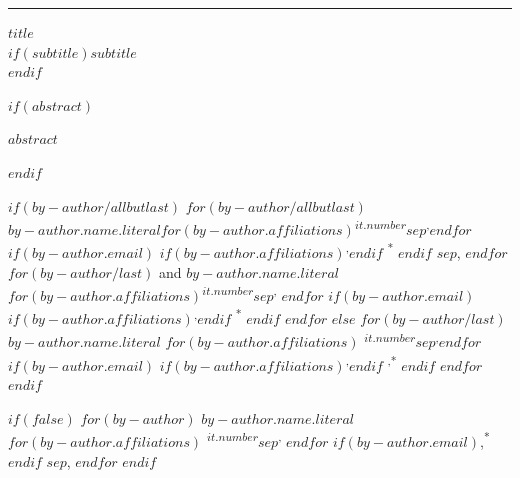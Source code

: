 
\raggedleft %
\thispagestyle{empty}
\rule{1pt}{\textheight} %
\hspace{0.05\textwidth} %
\begin{minipage}[b][\textheight][s]{0.85\textwidth}

\raggedright
{\color{bluegray}\huge\bfseries\nohyphens{$title$}}\\[1.25\baselineskip] 
$if(subtitle)${\color{bluegray}\large\textit{$subtitle$}}\\[4\baselineskip]$endif$

$if(abstract)$%
\begin{flushright}%
{{$abstract$}}\\[4\baselineskip]%
\end{flushright}%
$endif$

$if(by-author/allbutlast)$
$for(by-author/allbutlast)$
 {\large{$by-author.name.literal$}}$for(by-author.affiliations)${\textsuperscript{$it.number$}}$sep$\textsuperscript{,}$endfor$%
$if(by-author.email)$%
$if(by-author.affiliations)$\textsuperscript{,}$endif$%
{\textsuperscript{*}}%
$endif$%
$sep$, 
$endfor$
$for(by-author/last)$%
{ and \large{$by-author.name.literal$}}%
$for(by-author.affiliations)${\textsuperscript{$it.number$}}$sep$\textsuperscript{,}%
$endfor$%
$if(by-author.email)$%
$if(by-author.affiliations)$\textsuperscript{,}$endif$%
{\textsuperscript{*}}%
$endif$%
$endfor$
$else$
$for(by-author/last)$%
{\large{$by-author.name.literal$}}%
$for(by-author.affiliations)$%
{\textsuperscript{$it.number$}}$sep$\textsuperscript{,}$endfor$%
$if(by-author.email)$%
$if(by-author.affiliations)$\textsuperscript{,}$endif$%
{\textsuperscript{,*}}%
$endif$%
$endfor$
$endif$

$if(false)$%
$for(by-author)$%
{$by-author.name.literal$}%
$for(by-author.affiliations)$%
{\textsuperscript{$it.number$}}$sep${\textsuperscript{,}}%
$endfor$%
$if(by-author.email)$,{\textsuperscript{*}}%
$endif$%
$sep$, %
$endfor$%
$endif$

\vspace{2\baselineskip} 


\end{minipage}
